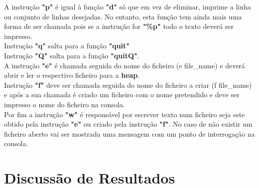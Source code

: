 \documentclass[letterpaper,12pt]{article}
\begin{document}
A instrução \textbf{"p"} é igual à função \textbf{"d"} só que em vez de eliminar, imprime a linha ou conjunto de linhas desejadas. No entanto, esta função tem ainda mais uma forma de ser chamada pois se a instrução for \textbf{"\%p"} todo o texto deverá ser impresso.\vspace{0.5cm}\\
Instrução \textbf{"q"} salta para a função \textbf{"quit"}\vspace{0.5cm}\\
Instrução \textbf{"Q"} salta para a função \textbf{"quitQ"}.\vspace{0.5cm}\\
A instrução \textbf{"e"} é chamada seguida do nome do ficheiro (e file\_name) e deverá abrir e ler o respectivo ficheiro para a \textbf{heap}.\vspace{0.5cm}\\
Instrução \textbf{"f"} deve ser chamada seguida do nome do ficheiro a criar (f file\_name) e após a sua chamada é criado um ficheiro com o nome pretendido e deve ser impresso o nome do ficheiro na consola.\vspace{0.5cm}\\
Por fim a instrução \textbf{"w"} é responsável por escrever texto num ficheiro seja este obtido pela instrução \textbf{"e"} ou criado pela instrução \textbf{"f"}. No caso de não existir um ficheiro aberto vai ser mostrada uma mensagem com um ponto de interrogação na consola.\\

\newpage
\section{Discussão de Resultados}
\end{document}
